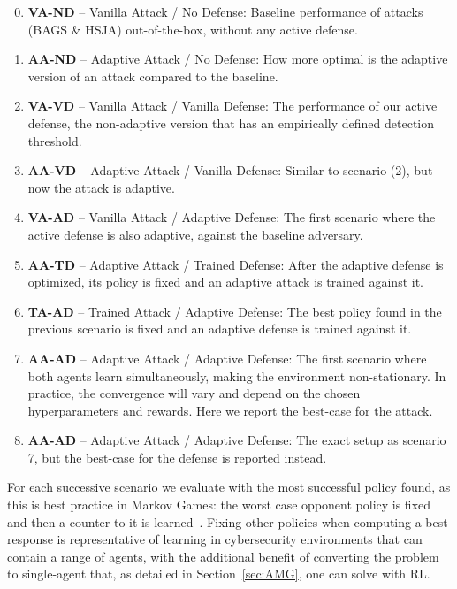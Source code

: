 \begin{enumerate}[leftmargin=*]
  \setcounter{enumi}{-1} 
      \setlength\itemsep{0.1em}
      \item \textbf{VA-ND} -- Vanilla Attack / No Defense: Baseline performance of attacks (BAGS \& HSJA) out-of-the-box, without any active defense.
      \item \textbf{AA-ND} -- Adaptive Attack / No Defense: How more optimal is the adaptive version of an attack compared to the baseline.
      \item \textbf{VA-VD} -- Vanilla Attack / Vanilla Defense: The performance of our active defense, the non-adaptive version that has an empirically defined detection threshold.
      \item \textbf{AA-VD} -- Adaptive Attack / Vanilla Defense: Similar to scenario (2), but now the attack is adaptive.
      \item \textbf{VA-AD} -- Vanilla Attack / Adaptive Defense: The first scenario where the active defense is also adaptive, against the baseline adversary.
      \item \textbf{AA-TD} -- Adaptive Attack / Trained Defense: After the adaptive defense is optimized, its policy is fixed and an adaptive attack is trained against it.
      \item \textbf{TA-AD} -- Trained Attack / Adaptive Defense: The best policy found in the previous scenario is fixed and an adaptive defense is trained against it.
      \item \textbf{AA-AD} -- Adaptive Attack / Adaptive Defense: The first scenario where both agents learn simultaneously, making the environment non-stationary. In practice, the convergence will vary and depend on the chosen hyperparameters and rewards. Here we report the best-case for the attack.
      \item \textbf{AA-AD} -- Adaptive Attack / Adaptive Defense: The exact setup as scenario 7, but the best-case for the defense is reported instead.
  \end{enumerate}

For each successive scenario we evaluate with the most successful policy found, as this is best practice in Markov Games: the worst case opponent policy is fixed and then a counter to it is learned~\cite{littman1994markov, timbers2022approximate}.
Fixing other policies when computing a best response is representative of learning in cybersecurity environments that can contain a range of agents, with the additional benefit of converting the problem to single-agent that, as detailed in Section~\ref{sec:AMG}, one can solve with \gls{RL}.

